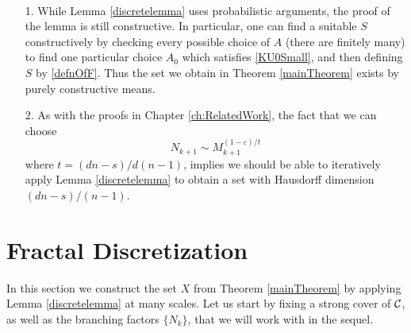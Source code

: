 \begin{remarks}
	\
	\begin{enumerate}
		\item[1.] While Lemma \ref{discretelemma} uses probabilistic arguments, the proof of the lemma is still constructive. In particular, one can find a suitable $S$ constructively by checking every possible choice of $A$ (there are finitely many) to find one particular choice $A_0$ which satisfies \eqref{KU0Small}, and then defining $S$ by \eqref{defnOfF}. Thus the set we obtain in Theorem \ref{mainTheorem} exists by purely constructive means.
		
		\item[2.] As with the proofs in Chapter \ref{ch:RelatedWork}, the fact that we can choose
		\[ N_{k+1} \sim M_{k+1}^{(1 - \varepsilon)/t} \]
		where $t = (dn - s)/d(n-1)$, implies we should be able to iteratively apply Lemma \ref{discretelemma} to obtain a set with Hausdorff dimension $(dn - s)/(n-1)$.
	\end{enumerate} 
\end{remarks}









\section{Fractal Discretization}\label{discretizationsection}

In this section we construct the set $X$ from Theorem \ref{mainTheorem} by applying Lemma \ref{discretelemma} at many scales. Let us start by fixing a strong cover of $\operatorname{\mathcal{C}}$, as well as the branching factors $\{ N_k \}$, that we will work with in the sequel.

